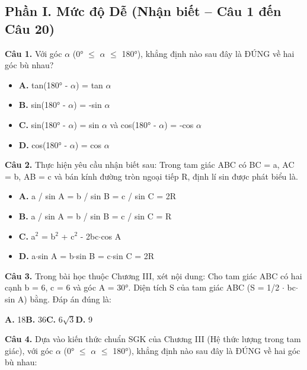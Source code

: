 \documentclass[11pt,a4paper]{article}
\begin{document}
\subsection*{\color{accent} Phần I. Mức độ Dễ (Nhận biết -- Câu 1 đến Câu 20)}
\textbf{\color{primary} Câu 1.} Với góc $\alpha$ (0° $\le$ $\alpha$ $\le$ 180°), khẳng định nào sau đây là ĐÚNG về hai góc bù nhau?\par
\begin{itemize}\setlength{\itemsep}{1pt}\setlength{\parskip}{0pt}
  \item[] \textbf{A.} tan(180° - $\alpha$) = tan $\alpha$
  \item[] \textbf{B.} sin(180° - $\alpha$) = -sin $\alpha$
  \item[] \textbf{C.} sin(180° - $\alpha$) = sin $\alpha$ và cos(180° - $\alpha$) = -cos $\alpha$
  \item[] \textbf{D.} cos(180° - $\alpha$) = cos $\alpha$
\end{itemize}\vspace{2pt}
\textbf{\color{primary} Câu 2.} Thực hiện yêu cầu nhận biết sau: Trong tam giác ABC có BC = a, AC = b, AB = c và bán kính đường tròn ngoại tiếp R, định lí sin được phát biểu là.\par
\begin{itemize}\setlength{\itemsep}{1pt}\setlength{\parskip}{0pt}
  \item[] \textbf{A.} a / sin A = b / sin B = c / sin C = 2R
  \item[] \textbf{B.} a / sin A = b / sin B = c / sin C = R
  \item[] \textbf{C.} a$^2$ = b$^2$ + c$^2$ - 2bc$\cdot$cos A
  \item[] \textbf{D.} a$\cdot$sin A = b$\cdot$sin B = c$\cdot$sin C = 2R
\end{itemize}\vspace{2pt}
\textbf{\color{primary} Câu 3.} Trong bài học thuộc Chương III, xét nội dung: Cho tam giác ABC có hai cạnh b = 6, c = 6 và góc A = 30°. Diện tích S của tam giác ABC (S = 1/2 $\cdot$ bc$\cdot$sin A) bằng. Đáp án đúng là:\par
\hspace*{1.5em}\textbf{A.} 18\quad\quad \textbf{B.} 36\quad\quad \textbf{C.} 6$\sqrt{3}$\quad\quad \textbf{D.} 9\par\vspace{2pt}
\textbf{\color{primary} Câu 4.} Dựa vào kiến thức chuẩn SGK của Chương III (Hệ thức lượng trong tam giác), với góc $\alpha$ (0° $\le$ $\alpha$ $\le$ 180°), khẳng định nào sau đây là ĐÚNG về hai góc bù nhau:\par
\end{document}

